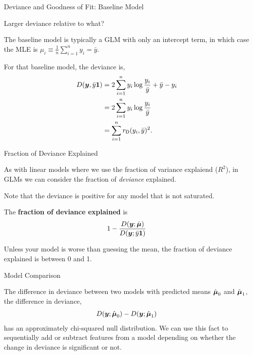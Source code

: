 \documentclass[aspectratio=169]{beamer}
\begin{document}
\begin{frame}[t,allowframebreaks]{Deviance and Goodness of
    Fit: Baseline Model}\label{deviance-and-goodness-of-fit}
    
Larger deviance relative to what?

The baseline model is typically a GLM with only an intercept term, in
which case the MLE is
\(\mu_i \equiv \frac{1}{n} \sum_{i=1}^n y_i = \bar{y}\). 

For that
baseline model, the deviance is, \begin{align*}
D(\boldsymbol{y}, \bar{y} \boldsymbol{1})
&= 2 \sum_{i=1}^n y_i \log \frac{y_i}{\bar{y}} + \bar{y} - y_i \\
&= 2 \sum_{i=1}^n y_i \log \frac{y_i}{\bar{y}} 
\\
&= \sum_{i=1}^n r_{\mathsf{D}}(y_i, \bar{y})^2.
\end{align*}

\end{frame}


\begin{frame}[t,allowframebreaks]{Fraction of Deviance
Explained}\label{fraction-of-deviance-explained}

As with linear models where we use the fraction of variance explaiend
(\(R^2\)), in GLMs we can consider the fraction of \emph{deviance}
explained. 

Note that the deviance is positive for any model that is not
saturated. 

The \textbf{fraction of deviance explained} is
\begin{align*}
    1 - \frac{D(\boldsymbol{y}; \hat{\boldsymbol{\mu}})}{D(\boldsymbol{y}; \bar{y} \boldsymbol{1})}
\end{align*} 

Unless your model is worse than guessing the mean, the fraction of deviance
explained is between 0 and 1.
\end{frame}

\begin{frame}[t,allowframebreaks]{Model Comparison}\label{model-comparison}

The difference in deviance between two models with predicted means
\(\hat{\boldsymbol{\mu}}_0\) and \(\hat{\boldsymbol{\mu}}_1\), the difference in deviance,
\begin{align*}
D(\boldsymbol{y}; \hat{\boldsymbol{\mu}}_0) - D(\boldsymbol{y}; \hat{\boldsymbol{\mu}}_1)
\end{align*} has an approximately chi-squared null distribution. We can
use this fact to sequentially add or subtract features from a model
depending on whether the change in deviance is significant or not.
\end{frame}
\end{document}

